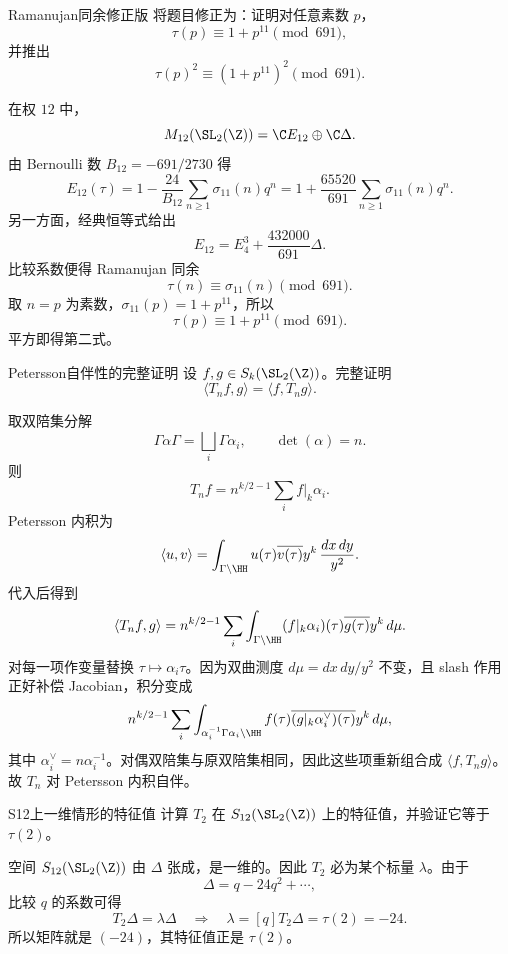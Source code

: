 \begin{problem}{Ramanujan同余修正版}
将题目修正为：证明对任意素数 $p$，
\[
\tau(p)\equiv 1+p^{11}\pmod{691},
\]
并推出
\[
\tau(p)^2\equiv (1+p^{11})^2\pmod{691}.
\]
\end{problem}
\begin{solution}
在权 $12$ 中，
\[
M_{12}(\SL_2(\Z))=\C E_{12}\oplus\C\Delta.
\]
由 Bernoulli 数 $B_{12}=-691/2730$ 得
\[
E_{12}(\tau)=1-\frac{24}{B_{12}}\sum_{n\ge1}\sigma_{11}(n)q^n
=1+\frac{65520}{691}\sum_{n\ge1}\sigma_{11}(n)q^n.
\]
另一方面，经典恒等式给出
\[
E_{12}=E_4^3+\frac{432000}{691}\Delta.
\]
比较系数便得 Ramanujan 同余
\[
\tau(n)\equiv\sigma_{11}(n)\pmod{691}.
\]
取 $n=p$ 为素数，$\sigma_{11}(p)=1+p^{11}$，所以
\[
\tau(p)\equiv1+p^{11}\pmod{691}.
\]
平方即得第二式。
\end{solution}

\begin{problem}{Petersson自伴性的完整证明}
设 $f,g\in S_k(\SL_2(\Z))$。完整证明
\[
\langle T_nf,g\rangle=\langle f,T_ng\rangle.
\]
\end{problem}
\begin{solution}
取双陪集分解
\[
\Gamma\alpha\Gamma=\bigsqcup_i\Gamma\alpha_i,
\qquad \det(\alpha)=n.
\]
则
\[
T_nf=n^{k/2-1}\sum_i f|_k\alpha_i.
\]
Petersson 内积为
\[
\langle u,v\rangle=\int_{\Gamma\backslash\HH}u(\tau)\overline{v(\tau)}y^k\,\frac{dx\,dy}{y^2}.
\]
代入后得到
\[
\langle T_nf,g\rangle=n^{k/2-1}\sum_i\int_{\Gamma\backslash\HH}(f|_k\alpha_i)(\tau)\overline{g(\tau)}y^k\,d\mu.
\]
对每一项作变量替换 $\tau\mapsto\alpha_i\tau$。因为双曲测度 $d\mu=dx\,dy/y^2$ 不变，且 slash 作用正好补偿 Jacobian，积分变成
\[
n^{k/2-1}\sum_i\int_{\alpha_i^{-1}\Gamma\alpha_i\backslash\HH}f(\tau)\overline{(g|_k\alpha_i^\vee)(\tau)}y^k\,d\mu,
\]
其中 $\alpha_i^\vee=n\alpha_i^{-1}$。对偶双陪集与原双陪集相同，因此这些项重新组合成 $\langle f,T_ng\rangle$。故 $T_n$ 对 Petersson 内积自伴。
\end{solution}

\begin{problem}{S12上一维情形的特征值}
计算 $T_2$ 在 $S_{12}(\SL_2(\Z))$ 上的特征值，并验证它等于 $\tau(2)$。
\end{problem}
\begin{solution}
空间 $S_{12}(\SL_2(\Z))$ 由 $\Delta$ 张成，是一维的。因此 $T_2$ 必为某个标量 $\lambda$。由于
\[
\Delta=q-24q^2+\cdots,
\]
比较 $q$ 的系数可得
\[
T_2\Delta=\lambda\Delta
\quad\Longrightarrow\quad
\lambda=[q]T_2\Delta=\tau(2)=-24.
\]
所以矩阵就是 $(-24)$，其特征值正是 $\tau(2)$。
\end{solution}

